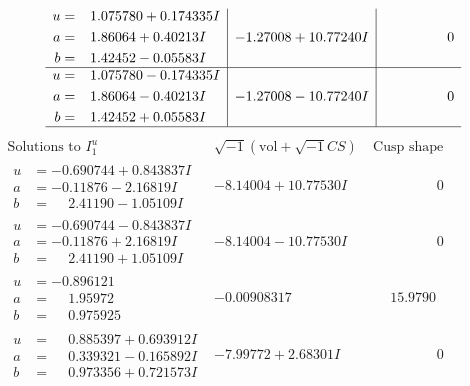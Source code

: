 \documentclass[1p]{elsarticle_modified}
\theoremstyle{definition}
\newcommand{\I}{\sqrt{-1}}
\begin{document}
$$\begin{array}{c|c|c}
\begin{aligned}
u &= \phantom{-}1.075780 + 0.174335 I \\
a &= \phantom{-}1.86064 + 0.40213 I \\
b &= \phantom{-}1.42452 - 0.05583 I\end{aligned}
 & -1.27008 + 10.77240 I & \phantom{-0.000000 } 0 \\ \hline\begin{aligned}
u &= \phantom{-}1.075780 - 0.174335 I \\
a &= \phantom{-}1.86064 - 0.40213 I \\
b &= \phantom{-}1.42452 + 0.05583 I\end{aligned}
 & -1.27008 - 10.77240 I & \phantom{-0.000000 } 0\\
 \hline 
 \end{array}$$\newpage$$\begin{array}{c|c|c}  
\text{Solutions to }I^u_{1}& \I (\text{vol} + \sqrt{-1}CS) & \text{Cusp shape}\\
 \hline 
\begin{aligned}
u &= -0.690744 + 0.843837 I \\
a &= -0.11876 - 2.16819 I \\
b &= \phantom{-}2.41190 - 1.05109 I\end{aligned}
 & -8.14004 + 10.77530 I & \phantom{-0.000000 } 0 \\ \hline\begin{aligned}
u &= -0.690744 - 0.843837 I \\
a &= -0.11876 + 2.16819 I \\
b &= \phantom{-}2.41190 + 1.05109 I\end{aligned}
 & -8.14004 - 10.77530 I & \phantom{-0.000000 } 0 \\ \hline\begin{aligned}
u &= -0.896121\phantom{ +0.000000I} \\
a &= \phantom{-}1.95972\phantom{ +0.000000I} \\
b &= \phantom{-}0.975925\phantom{ +0.000000I}\end{aligned}
 & -0.00908317\phantom{ +0.000000I} & \phantom{-}15.9790\phantom{ +0.000000I} \\ \hline\begin{aligned}
u &= \phantom{-}0.885397 + 0.693912 I \\
a &= \phantom{-}0.339321 - 0.165892 I \\
b &= \phantom{-}0.973356 + 0.721573 I\end{aligned}
 & -7.99772 + 2.68301 I & \phantom{-0.000000 } 0 \\ \hline\begin{aligned}

\end{aligned}
\end{array}$$
\end{document}
